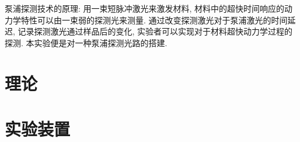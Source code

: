 \documentclass[aps,pre,12pt,preprint,%
	onecolumn,showpacs,showkeys,nofootinbib]{revtex4-2}
\begin{document}
泵浦探测技术的原理: 用一束短脉冲激光来激发材料, 材料中的超快时间响应的动力学特性可以由一束弱的探测光来测量. 通过改变探测激光对于泵浦激光的时间延迟, 记录探测激光通过样品后的变化, 实验者可以实现对于材料超快动力学过程的探测. 本实验便是对一种泵浦探测光路的搭建.
\section{理论}

\section{实验装置}
\end{document}
